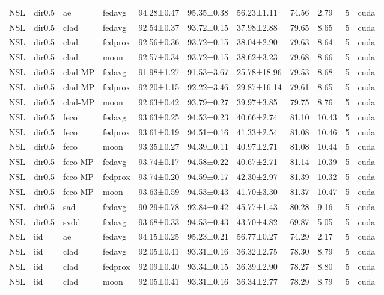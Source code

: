 \begin{tabular}{lllllllllrl}
NSL & dir0.5 & ae & fedavg & 94.28±0.47 & 95.35±0.38 & 56.23±1.11 & 74.56 & 2.79 & 5 & cuda \\
NSL & dir0.5 & clad & fedavg & 92.54±0.37 & 93.72±0.15 & 37.98±2.88 & 79.65 & 8.65 & 5 & cuda \\
NSL & dir0.5 & clad & fedprox & 92.56±0.36 & 93.72±0.15 & 38.04±2.90 & 79.63 & 8.64 & 5 & cuda \\
NSL & dir0.5 & clad & moon & 92.57±0.34 & 93.72±0.15 & 38.62±3.23 & 79.68 & 8.66 & 5 & cuda \\
NSL & dir0.5 & clad-MP & fedavg & 91.98±1.27 & 91.53±3.67 & 25.78±18.96 & 79.53 & 8.68 & 5 & cuda \\
NSL & dir0.5 & clad-MP & fedprox & 92.20±1.15 & 92.22±3.46 & 29.87±16.14 & 79.61 & 8.65 & 5 & cuda \\
NSL & dir0.5 & clad-MP & moon & 92.63±0.42 & 93.79±0.27 & 39.97±3.85 & 79.75 & 8.76 & 5 & cuda \\
NSL & dir0.5 & feco & fedavg & 93.63±0.25 & 94.53±0.23 & 40.66±2.74 & 81.10 & 10.43 & 5 & cuda \\
NSL & dir0.5 & feco & fedprox & 93.61±0.19 & 94.51±0.16 & 41.33±2.54 & 81.08 & 10.46 & 5 & cuda \\
NSL & dir0.5 & feco & moon & 93.35±0.27 & 94.39±0.11 & 40.97±2.71 & 81.08 & 10.44 & 5 & cuda \\
NSL & dir0.5 & feco-MP & fedavg & 93.74±0.17 & 94.58±0.22 & 40.67±2.71 & 81.14 & 10.39 & 5 & cuda \\
NSL & dir0.5 & feco-MP & fedprox & 93.74±0.20 & 94.59±0.17 & 42.30±2.97 & 81.39 & 10.32 & 5 & cuda \\
NSL & dir0.5 & feco-MP & moon & 93.63±0.59 & 94.53±0.43 & 41.70±3.30 & 81.37 & 10.47 & 5 & cuda \\
NSL & dir0.5 & sad & fedavg & 90.29±0.78 & 92.84±0.42 & 45.77±1.43 & 80.28 & 9.16 & 5 & cuda \\
NSL & dir0.5 & svdd & fedavg & 93.68±0.33 & 94.53±0.43 & 43.70±4.82 & 69.87 & 5.05 & 5 & cuda \\
NSL & iid & ae & fedavg & 94.15±0.25 & 95.23±0.21 & 56.77±0.27 & 74.29 & 2.17 & 5 & cuda \\
NSL & iid & clad & fedavg & 92.05±0.41 & 93.31±0.16 & 36.32±2.75 & 78.30 & 8.79 & 5 & cuda \\
NSL & iid & clad & fedprox & 92.09±0.40 & 93.34±0.15 & 36.39±2.90 & 78.27 & 8.80 & 5 & cuda \\
NSL & iid & clad & moon & 92.05±0.41 & 93.31±0.16 & 36.34±2.77 & 78.29 & 8.79 & 5 & cuda \\

\end{tabular}
